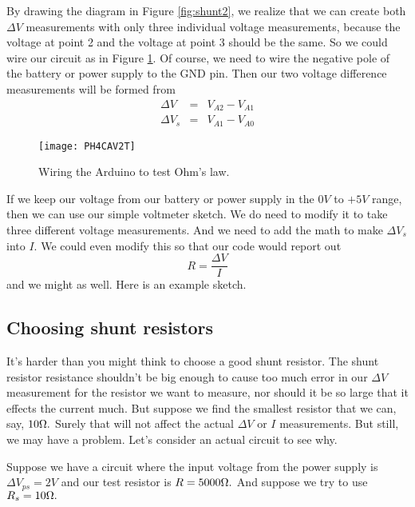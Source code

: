 By drawing the diagram in Figure \ref{fig:shunt2}, we
realize that we can create both $\Delta V$ measurements with only three
individual voltage measurements, because the voltage at point 2 and the
voltage at point 3 should be the same. So we could wire our circuit as
in Figure \ref{fig:shunt3}.
Of course, we need to wire the
negative pole of the battery or power supply to the GND pin. Then our two
voltage difference measurements will be formed from 
\begin{eqnarray*}
\Delta V &=&V_{A2}-V_{A1} \\
\Delta V_{s} &=&V_{A1}-V_{A0}
\end{eqnarray*}
\begin{figure}[htbp!]
	\centering
\texttt{[image: PH4CAV2T]}
	\caption[Wiring the Arduino to test Ohm's law]{Wiring the Arduino to
	test Ohm's law.}
	\label{fig:shunt3}
\end{figure}

If we keep our voltage from our battery or power supply in the $0\unit{V}$
to $+5\unit{V}$ range, then we can use our simple voltmeter sketch. We do
need to modify it to take three different voltage measurements. And we need
to add the math to make $\Delta V_{s}$ into $I.$ We could even modify this
so that our code would report out 
\begin{equation*}
R=\frac{\Delta V}{I}
\end{equation*}%
and we might as well. Here is an example sketch.



\subsection{Choosing shunt resistors}

It's harder than you might think to choose a good shunt resistor. The shunt
resistor resistance shouldn't be big enough to cause too much error in our $%
\Delta V$ measurement for the resistor we want to measure, nor should it be
so large that it effects the current much. But suppose we find the smallest
resistor that we can, say, $10\unit{%
\Omega%
}.$ Surely that will not affect the actual $\Delta V$ or $I$ measurements.
But still, we may have a problem. Let's consider an actual circuit to see
why.

Suppose we have a circuit where the input voltage from the power supply is $%
\Delta V_{ps}=2\unit{V}$ and our test resistor is $R=5000\unit{%
\Omega%
}.$ And suppose we try to use $R_{s}=10\unit{%
\Omega%
}.$ 


